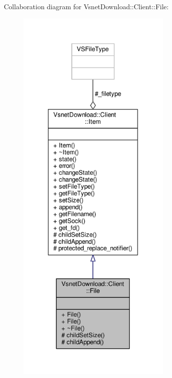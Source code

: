 Collaboration diagram for Vsnet\+Download\+:\+:Client\+:\+:File\+:
\nopagebreak
\begin{figure}[H]
\begin{center}
\leavevmode
\includegraphics[height=550pt]{df/d3e/classVsnetDownload_1_1Client_1_1File__coll__graph}
\end{center}
\end{figure}
